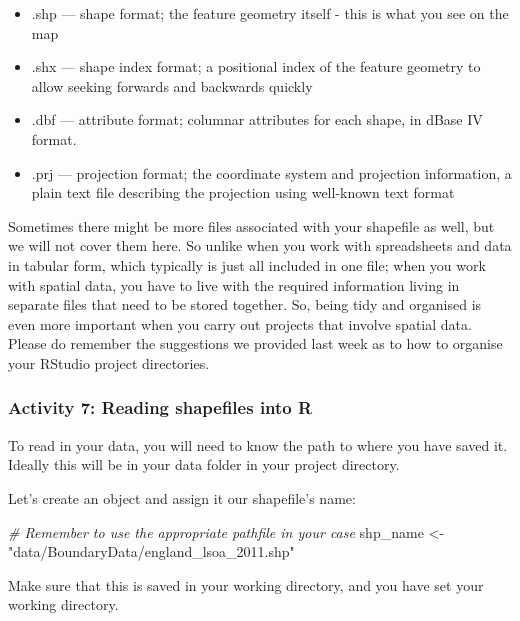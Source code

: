 \documentclass[
]{book}
\newenvironment{Shaded}{\begin{snugshade}}{\end{snugshade}}
\newcommand{\CommentTok}[1]{\textcolor[rgb]{0.56,0.35,0.01}{\textit{#1}}}
\newcommand{\NormalTok}[1]{#1}
\newcommand{\OtherTok}[1]{\textcolor[rgb]{0.56,0.35,0.01}{#1}}
\newcommand{\StringTok}[1]{\textcolor[rgb]{0.31,0.60,0.02}{#1}}
\providecommand{\tightlist}{%
  \setlength{\itemsep}{0pt}\setlength{\parskip}{0pt}}
\begin{document}
\begin{itemize}
\tightlist
\item
  .shp --- shape format; the feature geometry itself - this is what you see on the map
\item
  .shx --- shape index format; a positional index of the feature geometry to allow seeking forwards and backwards quickly
\item
  .dbf --- attribute format; columnar attributes for each shape, in dBase IV format.
\item
  .prj --- projection format; the coordinate system and projection information, a plain text file describing the projection using well-known text format
\end{itemize}

Sometimes there might be more files associated with your shapefile as well, but we will not cover them here. So unlike when you work with spreadsheets and data in tabular form, which typically is just all included in one file; when you work with spatial data, you have to live with the required information living in separate files that need to be stored together. So, being tidy and organised is even more important when you carry out projects that involve spatial data. Please do remember the suggestions we provided last week as to how to organise your RStudio project directories.

\hypertarget{activity-7-reading-shapefiles-into-r}{%
\subsubsection{Activity 7: Reading shapefiles into R}\label{activity-7-reading-shapefiles-into-r}}

To read in your data, you will need to know the path to where you have saved it. Ideally this will be in your data folder in your project directory.

Let's create an object and assign it our shapefile's name:

\begin{Shaded}
\begin{Highlighting}[]
\CommentTok{\# Remember to use the appropriate pathfile in your case}
\NormalTok{shp\_name }\OtherTok{\textless{}{-}} \StringTok{"data/BoundaryData/england\_lsoa\_2011.shp"}
\end{Highlighting}
\end{Shaded}

Make sure that this is saved in your working directory, and you have set your working directory.
\end{document}
